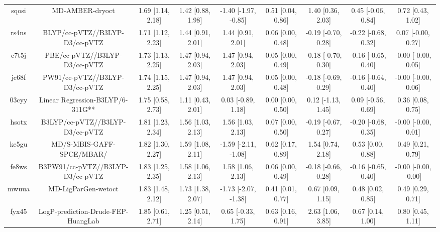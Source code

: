 \documentclass{article}
\begin{document}
\begin{center}
\begin{longtable}{|ccccccccc|}
 sqosi &                                    MD-AMBER-dryoct &  1.69 [1.14, 2.18] &  1.42 [0.88, 1.98] &  -1.40 [-1.97, -0.85] &  0.51 [0.04, 0.86] &    1.40 [0.36, 2.03] &   0.45 [-0.06, 0.84] &     0.72 [0.43, 1.02] \\
 rs4ns &                     BLYP/cc-pVTZ//B3LYP-D3/cc-pVTZ &  1.71 [1.12, 2.23] &  1.44 [0.91, 2.01] &     1.44 [0.91, 2.01] &  0.06 [0.00, 0.48] &  -0.19 [-0.70, 0.28] &  -0.22 [-0.68, 0.32] &    0.07 [-0.00, 0.27] \\
 c7t5j &                      PBE/cc-pVTZ//B3LYP-D3/cc-pVTZ &  1.73 [1.13, 2.25] &  1.47 [0.94, 2.03] &     1.47 [0.94, 2.03] &  0.05 [0.00, 0.49] &  -0.18 [-0.70, 0.30] &  -0.16 [-0.65, 0.40] &   -0.00 [-0.00, 0.05] \\
 jc68f &                     PW91/cc-pVTZ//B3LYP-D3/cc-pVTZ &  1.74 [1.15, 2.25] &  1.47 [0.94, 2.03] &     1.47 [0.94, 2.03] &  0.05 [0.00, 0.48] &  -0.18 [-0.69, 0.29] &  -0.16 [-0.64, 0.40] &   -0.00 [-0.00, 0.06] \\
 03cyy &                   Linear Regression-B3LYP/6-311G** &  1.75 [0.58, 2.73] &  1.11 [0.43, 2.01] &    0.03 [-0.89, 1.18] &  0.00 [0.00, 0.50] &   0.12 [-1.13, 1.45] &   0.09 [-0.56, 0.69] &     0.36 [0.08, 0.75] \\
 hsotx &                    B3LYP/cc-pVTZ//B3LYP-D3/cc-pVTZ &  1.81 [1.23, 2.34] &  1.56 [1.03, 2.13] &     1.56 [1.03, 2.13] &  0.07 [0.00, 0.50] &  -0.19 [-0.67, 0.27] &  -0.20 [-0.68, 0.35] &   -0.00 [-0.00, 0.01] \\
 ke5gu &                          MD/S-MBIS-GAFF-SPCE/MBAR/ &  1.82 [1.30, 2.27] &  1.59 [1.08, 2.11] &  -1.59 [-2.11, -1.08] &  0.62 [0.17, 0.89] &    1.54 [0.74, 2.18] &    0.53 [0.00, 0.88] &     0.49 [0.21, 0.79] \\
 fe8ws &                   B3PW91/cc-pVTZ//B3LYP-D3/cc-pVTZ &  1.83 [1.25, 2.35] &  1.58 [1.06, 2.13] &     1.58 [1.06, 2.13] &  0.06 [0.00, 0.49] &  -0.18 [-0.66, 0.28] &  -0.16 [-0.65, 0.40] &  -0.00 [-0.00, -0.00] \\
 mwuua &                                MD-LigParGen-wetoct &  1.83 [1.48, 2.12] &  1.73 [1.38, 2.07] &  -1.73 [-2.07, -1.38] &  0.41 [0.01, 0.77] &    0.67 [0.09, 1.15] &    0.48 [0.02, 0.85] &     0.49 [0.29, 0.71] \\
 fyx45 &                 LogP-prediction-Drude-FEP-HuangLab &  1.85 [0.61, 2.71] &  1.25 [0.51, 2.14] &    0.65 [-0.33, 1.75] &  0.63 [0.16, 0.91] &    2.63 [1.06, 3.85] &    0.67 [0.14, 1.00] &     0.80 [0.45, 1.11] \\

\end{longtable}
\end{center}
\end{document}
